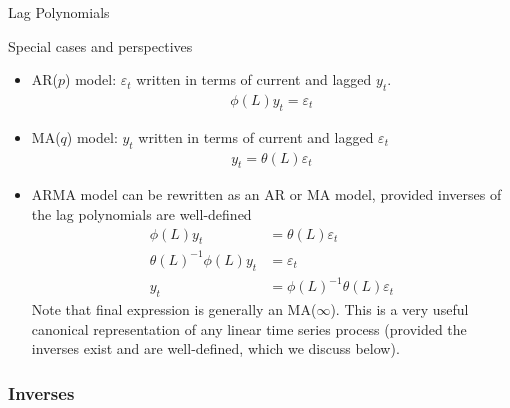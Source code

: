 \documentclass[aspectratio=169, handout]{beamer}
\begin{document}
{\footnotesize
\begin{frame}{Lag Polynomials}

Special cases and perspectives
\begin{itemize}
  \item AR($p$) model:
    $\varepsilon_t$ written in terms of current and lagged $y_t$.
    \begin{align*}
      \phi(L)y_t = \varepsilon_t
    \end{align*}


  \item MA($q$) model:
    $y_t$ written in terms of current and lagged $\varepsilon_t$
    \begin{align*}
      y_t = \theta(L)\varepsilon_t
    \end{align*}

  \item
    ARMA model can be rewritten as an AR or MA model, provided
    \alert{inverses} of the lag polynomials are well-defined
    \begin{align*}
      \phi(L)
      y_t
      &=
      \theta(L)
      \varepsilon_{t}
      \\
      \theta(L)^{-1}
      \phi(L)
      y_t
      &=
      \varepsilon_{t}
      \\
      y_t
      &=
      \phi(L)^{-1}
      \theta(L)
      \varepsilon_{t}
    \end{align*}
    Note that final expression is generally an \alert{MA($\infty$)}.
    This is a very useful \alert{canonical} representation of any linear
    time series process (provided the inverses exist and are
    well-defined, which we discuss below).
\end{itemize}
\end{frame}
}



\subsubsection{Inverses}
\end{document}
